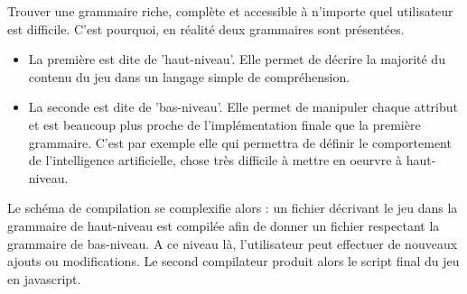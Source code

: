 Trouver une grammaire riche, complète et accessible à n'importe quel utilisateur est difficile.
C'est pourquoi, en réalité deux grammaires sont présentées.

\begin{itemize}
 \item La première est dite de 'haut-niveau'.
Elle permet de décrire la majorité du contenu du jeu dans un langage simple de compréhension.
 \item La seconde est dite de 'bas-niveau'.
Elle permet de manipuler chaque attribut et est beaucoup plus proche de l'implémentation finale que la première grammaire.
C'est par exemple elle qui permettra de définir le comportement de l'intelligence artificielle, chose très difficile à mettre en oeurvre à haut-niveau.
\end{itemize}

Le schéma de compilation se complexifie alors : un fichier décrivant le jeu dans la grammaire de haut-niveau est compilée afin de donner un fichier
respectant la grammaire de bas-niveau. A ce niveau là, l'utilisateur peut effectuer de nouveaux ajouts ou modifications. Le second compilateur
produit alors le script final du jeu en javascript.

